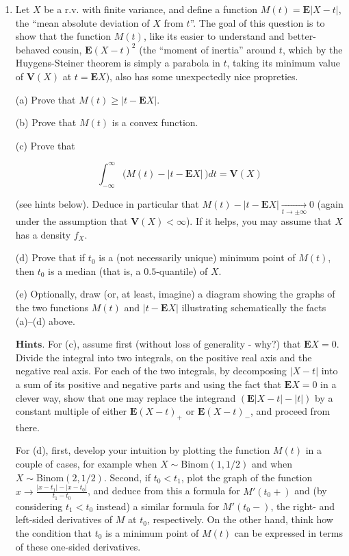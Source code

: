 \documentclass[11pt]{report}
\theoremstyle{plain}
\theoremstyle{definition}
\begin{document}
\begin{enumerate}[label=\arabic*.]
\[
\mathrm{P}\left( \lim_{n\to\infty} \frac{1}{n}\sum_{k=1}^n X_k\textrm{ does not exist} \right) = 1.
\]

\item Let $X$ be a r.v. with finite variance, and define a
function $M(t)=\mathbf{E}|X-t|$, the ``mean absolute
deviation of $X$ from $t$''. The goal of this
question is to show that the function $M(t)$, like
its easier to understand and better-behaved cousin,
$\mathbf{E}(X-t)^2$ (the ``moment of inertia'' around
$t$, which by the Huygens-Steiner theorem is simply a
parabola in $t$, taking its minimum value of
$\mathbf{V}(X)$ at $t=\mathbf{E} X$), also has some
unexpectedly nice propreties.

(a) Prove that $M(t) \ge |t- \mathbf{E} X|$.

(b) Prove that $M(t)$ is a convex function.

(c) Prove that

\[
\int_{-\infty}^\infty \Big( M(t)-|t-\mathbf{E} X|\, \Big)  dt =  \mathbf{V}(X)
\]

(see hints below). Deduce in particular that
$M(t)-|t-\mathbf{E} X|\xrightarrow[t\to\pm \infty]{}
0$
(again under the assumption that
$\mathbf{V}(X)<\infty$). If it helps, you may assume
that $X$ has a density $f_X$.

(d) Prove that if $t_0$ is a (not necessarily unique)
minimum point of $M(t)$, then $t_0$ is a median (that
is, a $0.5$-quantile) of $X$.

(e) Optionally, draw (or, at least, imagine) a
diagram showing the graphs of the two functions $M(t)$
and $|t-\mathbf{E} X|$ illustrating schematically
the facts (a)--(d) above.

$\textbf{Hints.}$ For (c), assume first (without loss
of generality - why?) that $\mathbf{E} X=0$. Divide
the integral into two integrals, on the positive real
axis and the negative real axis. For each of the two
integrals, by decomposing $|X-t|$ into a sum of its
positive and negative parts and using the fact that
$\mathbf{E} X=0$ in a clever way, show that one may
replace the integrand $(\mathbf{E}|X-t|-|t|)$ by a
constant multiple of either $\mathbf{E}(X-t)_+$ or
$\mathbf{E}(X-t)_-$, and proceed from there.

For (d), first, develop your intuition by plotting
the function $M(t)$ in a couple of cases, for example
when $X\sim \textrm{Binom}(1,1/2)$ and when
$X\sim \textrm{Binom}(2,1/2)$. Second, if $t_0<t_1$,
plot the graph of the function
$x\to \frac{|x-t_1|-|x-t_0|}{t_1-t_0}$, and deduce
from this a formula for $M'(t_0+)$ and (by
considering $t_1<t_0$ instead) a similar formula for
$M'(t_0-)$, the right- and left-sided derivatives of
$M$ at $t_0$, respectively. On the other hand, think
how the condition that $t_0$ is a minimum point of
$M(t)$ can be expressed in terms of these one-sided
derivatives.


\end{enumerate}
\end{document}
